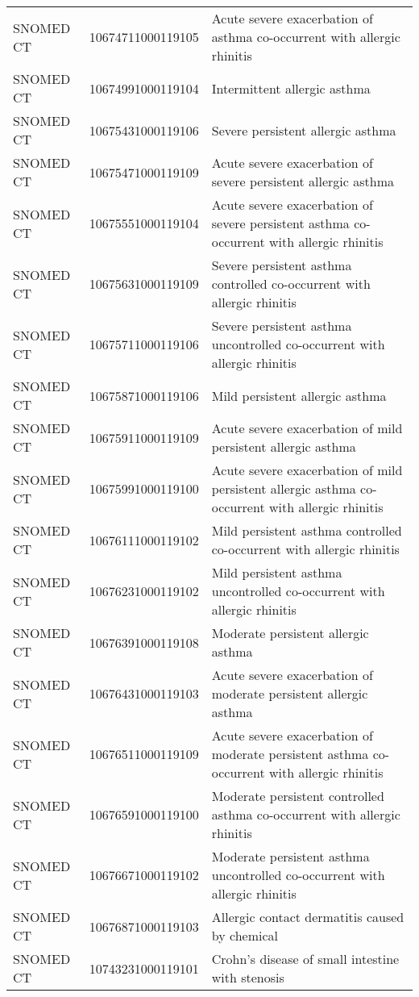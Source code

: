 \begin{longtable}{p{}p{}p{}}
  SNOMED CT & 10674711000119105 & Acute severe exacerbation of asthma co-occurrent with allergic rhinitis \\ 
  SNOMED CT & 10674991000119104 & Intermittent allergic asthma \\ 
  SNOMED CT & 10675431000119106 & Severe persistent allergic asthma \\ 
  SNOMED CT & 10675471000119109 & Acute severe exacerbation of severe persistent allergic asthma \\ 
  SNOMED CT & 10675551000119104 & Acute severe exacerbation of severe persistent asthma co-occurrent with allergic rhinitis \\ 
  SNOMED CT & 10675631000119109 & Severe persistent asthma controlled co-occurrent with allergic rhinitis \\ 
  SNOMED CT & 10675711000119106 & Severe persistent asthma uncontrolled co-occurrent with allergic rhinitis \\ 
  SNOMED CT & 10675871000119106 & Mild persistent allergic asthma \\ 
  SNOMED CT & 10675911000119109 & Acute severe exacerbation of mild persistent allergic asthma \\ 
  SNOMED CT & 10675991000119100 & Acute severe exacerbation of mild persistent allergic asthma co-occurrent with allergic rhinitis \\ 
  SNOMED CT & 10676111000119102 & Mild persistent asthma controlled co-occurrent with allergic rhinitis \\ 
  SNOMED CT & 10676231000119102 & Mild persistent asthma uncontrolled co-occurrent with allergic rhinitis \\ 
  SNOMED CT & 10676391000119108 & Moderate persistent allergic asthma \\ 
  SNOMED CT & 10676431000119103 & Acute severe exacerbation of moderate persistent allergic asthma \\ 
  SNOMED CT & 10676511000119109 & Acute severe exacerbation of moderate persistent asthma co-occurrent with allergic rhinitis \\ 
  SNOMED CT & 10676591000119100 & Moderate persistent controlled asthma co-occurrent with allergic rhinitis \\ 
  SNOMED CT & 10676671000119102 & Moderate persistent asthma uncontrolled co-occurrent with allergic rhinitis \\ 
  SNOMED CT & 10676871000119103 & Allergic contact dermatitis caused by chemical \\ 
  SNOMED CT & 10743231000119101 & Crohn's disease of small intestine with stenosis \\ 

\end{longtable}
